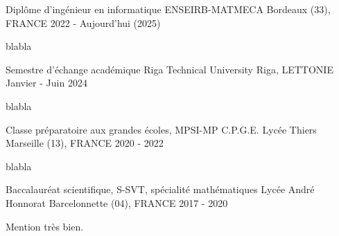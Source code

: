 

\begin{cventries}

  \cventry
    {Diplôme d'ingénieur en informatique} %
    {ENSEIRB-MATMECA} %
    {Bordeaux (33), FRANCE} %
    {2022 - Aujourd'hui (2025)} %
    {
      \begin{cvitems} %
        \item{blabla}
      \end{cvitems}
    }
\cventry
{Semestre d'échange académique} %
{Riga Technical University} %
{Riga, LETTONIE} %
{Janvier - Juin 2024} %
{
  \begin{cvitems} %
    \item{blabla}
  \end{cvitems}
}
\cventry
{Classe préparatoire aux grandes écoles, MPSI-MP} %
{C.P.G.E. Lycée Thiers} %
{Marseille (13), FRANCE} %
{2020 - 2022} %
{
  \begin{cvitems} %
    \item{blabla}
  \end{cvitems}
}
\cventry
{Baccalauréat scientifique, S-SVT, spécialité mathématiques} %
{Lycée André Honnorat} %
{Barcelonnette (04), FRANCE} %
{2017 - 2020} %
{
  \begin{cvitems} %
    \item{Mention très bien.}
  \end{cvitems}
}

\end{cventries}
